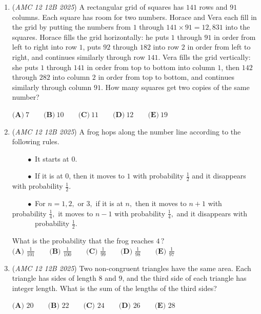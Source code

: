 \begin{enumerate}
 $\textbf{(A) } \frac{5}{2} \qquad \textbf{(B) } 3 \qquad \textbf{(C) } \frac{16}{5} \qquad \textbf{(D) } \frac{7}{2} \qquad \textbf{(E) } \frac{15}{4}$


	\item (\textit{AMC 12 12B 2025}) A rectangular grid of squares has $141$ rows and $91$ columns. Each square has room for two numbers. Horace and Vera each fill in the grid by putting the numbers from $1$ through $141 \times 91 = 12{,}831$ into the squares. Horace fills the grid horizontally: he puts $1$ through $91$ in order from left to right into row $1$, puts $92$ through $182$ into row $2$ in order from left to right, and continues similarly through row $141$. Vera fills the grid vertically: she puts $1$ through $141$ in order from top to bottom into column $1$, then $142$ through $282$ into column $2$ in order from top to bottom, and continues similarly through column $91$. How many squares get two copies of the same number?


 $\textbf{(A)}~7 \qquad \textbf{(B)}~10 \qquad \textbf{(C)}~11 \qquad \textbf{(D)}~12 \qquad \textbf{(E)}~19$


	\item (\textit{AMC 12 12B 2025}) A frog hops along the number line according to the following rules.


 $\qquad\bullet$ It starts at $0$.


 $\qquad\bullet$ If it is at $0$, then it moves to $1$ with probability $\frac{1}{2}$ and it disappears with probability $\frac{1}{2}$.


 $\qquad\bullet$ For $n = 1, 2,$ or $3,$ if it is at $n,$ then it moves to $n+1$ with probability $\frac{1}{4},$ it moves to $n-1$ with probability $\frac{1}{4},$ and it disappears with $\qquad\phantom{\bullet}$ probability $\frac{1}{2}$.


 What is the probability that the frog reaches ${4\,?}$
$\textbf{(A) } \frac1{101} \qquad \textbf{(B) } \frac 1{100} \qquad \textbf{(C) } \frac1{99} \qquad \textbf{(D) } \frac1{98} \qquad \textbf{(E) } \frac1{97}$


	\item (\textit{AMC 12 12B 2025}) Two non-congruent triangles have the same area. Each triangle has sides of length $8$ and $9$, and the third side of each triangle has integer length. What is the sum of the lengths of the third sides?


 $\textbf{(A) } 20 \qquad \textbf{(B) } 22 \qquad \textbf{(C) } 24 \qquad \textbf{(D) } 26 \qquad \textbf{(E) } 28$



\end{enumerate}
